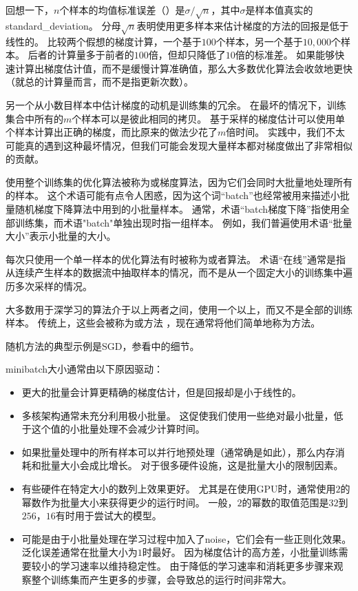 回想一下，$n$个样本的均值标准误差（）是$\sigma/\sqrt{n}$，其中$\sigma$是样本值真实的\gls{standard_deviation}。
分母$\sqrt{n}$表明使用更多样本来估计梯度的方法的回报是低于线性的。
比较两个假想的梯度计算，一个基于$100$个样本，另一个基于$10,000$个样本。
后者的计算量多于前者的$100$倍，但却只降低了$10$倍的标准差。
如果能够快速计算出梯度估计值，而不是缓慢计算准确值，那么大多数优化算法会收敛地更快（就总的计算量而言，而不是指更新次数）。

另一个从小数目样本中估计梯度的动机是训练集的冗余。
在最坏的情况下，训练集合中所有的$m$个样本可以是彼此相同的拷贝。
基于采样的梯度估计可以使用单个样本计算出正确的梯度，而比原来的做法少花了$m$倍时间。
实践中，我们不太可能真的遇到这种最坏情况，但我们可能会发现大量样本都对梯度做出了非常相似的贡献。

使用整个训练集的优化算法被称为或梯度算法，因为它们会同时大批量地处理所有的样本。
这个术语可能有点令人困惑，因为这个词``\gls{batch}''也经常被用来描述小批量随机梯度下降算法中用到的小批量样本。
通常，术语``\gls{batch}梯度下降''指使用全部训练集，而术语"\gls{batch}"单独出现时指一组样本。
例如，我们普遍使用术语``批量大小''表示小批量的大小。

每次只使用一个单一样本的优化算法有时被称为或者算法。
术语``在线''通常是指从连续产生样本的数据流中抽取样本的情况，而不是从一个固定大小的训练集中遍历多次采样的情况。


大多数用于深学习的算法介于以上两者之间，使用一个以上，而又不是全部的训练样本。
传统上，这些会被称为或方法 ，现在通常将他们简单地称为方法。

随机方法的典型示例是\gls{SGD}，参看中的细节。

\gls{minibatch}大小通常由以下原因驱动：
\begin{itemize}
    \item 更大的批量会计算更精确的梯度估计，但是回报却是小于线性的。
    
    \item 多核架构通常未充分利用极小批量。
    这促使我们使用一些绝对最小批量，低于这个值的小批量处理不会减少计算时间。
    
    \item 如果批量处理中的所有样本可以并行地预处理（通常确是如此），那么内存消耗和批量大小会成比增长。
    对于很多硬件设施，这是批量大小的限制因素。
    
    \item 有些硬件在特定大小的数列上效果更好。
    尤其是在使用GPU时，通常使用$2$的幂数作为批量大小来获得更少的运行时间。
    一般，$2$的幂数的取值范围是$32$到$256$，$16$有时用于尝试大的模型。
    
    \item 
    可能是由于小批量处理在学习过程中加入了\gls{noise}，它们会有一些正则化效果\citep{Wilson-2003}。
    泛化误差通常在批量大小为$1$时最好。
    因为梯度估计的高方差，小批量训练需要较小的学习速率以维持稳定性。
    由于降低的学习速率和消耗更多步骤来观察整个训练集而产生更多的步骤，会导致总的运行时间非常大。
\end{itemize}

